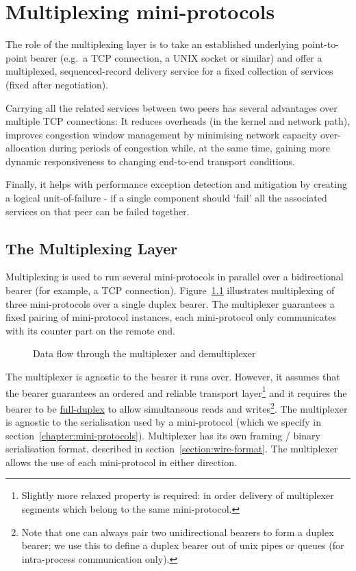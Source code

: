 \chapter{Multiplexing mini-protocols}
\label{chapter:multiplexer}

The role of the multiplexing layer is to take an established underlying
point-to-point bearer (e.g.~a TCP connection, a UNIX socket or similar) and
offer a multiplexed, sequenced-record delivery service for a fixed collection of
services (fixed after negotiation). 

Carrying all the related services between two peers has several advantages over
multiple TCP connections: It reduces overheads (in the kernel and network path),
improves congestion window management by minimising network capacity
over-allocation during periods of congestion while, at the same time, gaining
more dynamic responsiveness to changing end-to-end transport conditions.

Finally, it helps with performance exception detection and mitigation by creating
a logical unit-of-failure - if a single component should `fail' all the
associated services on that peer can be failed together.

\section{The Multiplexing Layer}
\label{multiplexing-section}
Multiplexing is used to run several mini-protocols in parallel over
a bidirectional bearer (for example, a TCP connection).
Figure~\ref{mux-diagram} illustrates multiplexing of three mini-protocols over
a single duplex bearer.  The multiplexer guarantees a fixed pairing of
mini-protocol instances, each mini-protocol only communicates with its counter
part on the remote end.

\begin{figure}[ht]
\begin{center}
\end{center}
\caption{Data flow through the multiplexer and demultiplexer}
\label{mux-diagram}
\end{figure}


The multiplexer is agnostic to the bearer it runs over. However, it assumes that
the bearer guarantees an ordered and reliable transport layer\footnote{Slightly
more relaxed property is required: in order delivery of multiplexer segments
which belong to the same mini-protocol.} and it requires the bearer to be
\href{https://www.wikiwand.com/en/Duplex\_(telecommunications)\#Full\_duplex}{full-duplex}
to allow simultaneous reads and writes\footnote{Note that one can always pair
two unidirectional bearers to form a duplex bearer; we use this to define
a duplex bearer out of unix pipes or queues (for intra-process communication
only).}.  The multiplexer is agnostic to the serialisation used by
a mini-protocol (which we specify in section~\ref{chapter:mini-protocols}).
Multiplexer has its own framing / binary serialisation format, 
described in section~\ref{section:wire-format}.  The multiplexer allows the use
of each mini-protocol in either direction.

